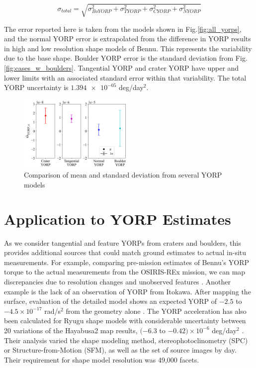 \begin{equation}
    \sigma_{total} = \sqrt{\sigma_{BoYORP}^2 + \sigma_{TYORP}^2 + \sigma_{CYORP}^2 + \sigma_{NYORP}^2}
\end{equation}

The error reported here is taken from the models shown in Fig.\ref{fig:all_yorps}, and the normal YORP error is extrapolated from the difference in YORP results in high and low resolution shape models of Bennu. This represents the variability due to the base shape. Boulder YORP error is the standard deviation from Fig.\ref{fig:cases_w_boulders}. Tangential YORP and crater YORP have upper and lower limits with an associated standard error within that variability. The total YORP uncertainty is $\num{1.394e-05}$ deg/day$^2$.

\begin{figure}[H]
    \centering
    \includegraphics[width=0.49\textwidth]{fig/error_compare.png}
    \caption{Comparison of mean and standard deviation from several YORP models}
    \label{fig:err_comp}
\end{figure}
\section{Application to YORP Estimates}\label{implications}

As we consider tangential and feature YORPs from craters and boulders, this provides additional sources that could match ground estimates to actual in-situ measurements. For example, comparing pre-mission estimates of Bennu's YORP torque to the actual measurements from the OSIRIS-REx mission, we can map discrepancies due to resolution changes and unobserved features \cite{Nolan2019}. Another example is the lack of an observation of YORP from Itokawa. After mapping the surface, evaluation of the detailed model shows an expected YORP of $-2.5$ to $-4.5 \times 10^{-17}$ rad/s$^2$ from the geometry alone \cite{Scheeres2007a}. The YORP acceleration has also been calculated for Ryugu shape models with considerable uncertainty between 20 variations of the Hayabusa2 map results, $(-6.3$ to $-0.42) \times 10^{-6}$ deg/day$^2$ \cite{Kanamaru2021}. Their analysis varied the shape modeling method, stereophotoclinometry (SPC) or Structure-from-Motion (SFM), as well as the set of source images by day. Their requirement for shape model resolution was 49,000 facets. 


